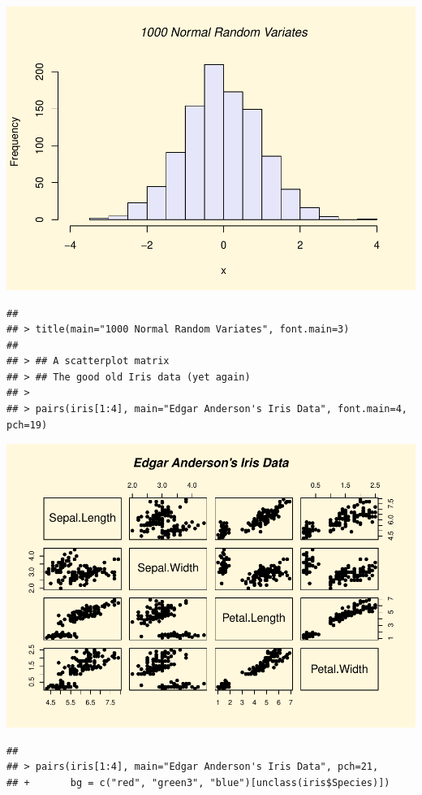 \documentclass[
]{book}
\begin{document}
\includegraphics{TudodoR_files/figure-latex/unnamed-chunk-147-7.pdf}

\begin{verbatim}
## 
## > title(main="1000 Normal Random Variates", font.main=3)
## 
## > ## A scatterplot matrix
## > ## The good old Iris data (yet again)
## > 
## > pairs(iris[1:4], main="Edgar Anderson's Iris Data", font.main=4, pch=19)
\end{verbatim}

\includegraphics{TudodoR_files/figure-latex/unnamed-chunk-147-8.pdf}

\begin{verbatim}
## 
## > pairs(iris[1:4], main="Edgar Anderson's Iris Data", pch=21,
## +       bg = c("red", "green3", "blue")[unclass(iris$Species)])
\end{verbatim}
\end{document}
